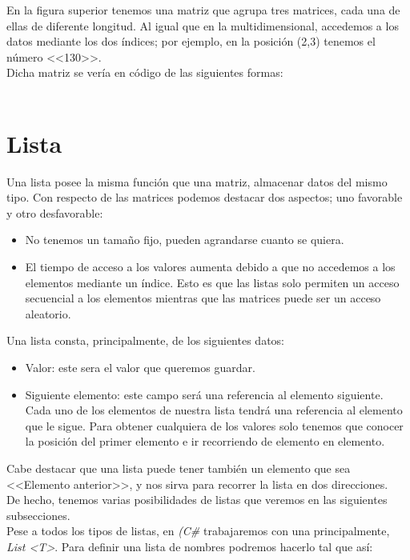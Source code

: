\documentclass[11pt, oneside]{book}		%
\begin{document}
		En la figura superior tenemos una matriz que agrupa tres matrices, cada una de ellas de diferente longitud. Al igual que en la multidimensional, accedemos a los datos mediante los dos índices; por ejemplo, en la posición (2,3) tenemos el número <<130>>.\\
		Dicha matriz se vería en código de las siguientes formas:
		\\\\\begin{minipage}[c]{0.95\textwidth}
			
		\end{minipage}
	\section{Lista}
	Una lista\cite{msdn:lista} posee la misma función que una matriz, almacenar datos del mismo tipo. Con respecto de las matrices podemos destacar dos aspectos; uno favorable y otro desfavorable:
	\begin{itemize}
		\item No tenemos un tamaño fijo, pueden agrandarse cuanto se quiera.
		\item El tiempo de acceso a los valores aumenta debido a que no accedemos a los elementos mediante un índice. Esto es que las listas solo permiten un acceso secuencial a los elementos mientras que las matrices puede ser un acceso aleatorio.
	\end{itemize}
	Una lista consta, principalmente, de los siguientes datos:
	\begin{itemize}
		\item Valor: este sera el valor que queremos guardar.
		\item Siguiente elemento: este campo será una referencia al elemento siguiente. Cada uno de los elementos de nuestra lista tendrá una referencia al elemento que le sigue. Para obtener cualquiera de los valores solo tenemos que conocer la posición del primer elemento e ir recorriendo de elemento en elemento.
	\end{itemize}
	Cabe destacar que una lista puede tener también un elemento que sea <<Elemento anterior>>, y nos sirva para recorrer la lista en dos direcciones.\\
	De hecho, tenemos varias posibilidades de listas que veremos en las siguientes subsecciones.\\
	Pese a todos los tipos de listas, en \textit{(C\#} trabajaremos con una principalmente, \textit{List \textless T\textgreater}. Para definir una lista de nombres podremos hacerlo tal que así:
	\\\\\begin{minipage}[c]{0.95\textwidth}
		
	\end{minipage}
\end{document}
